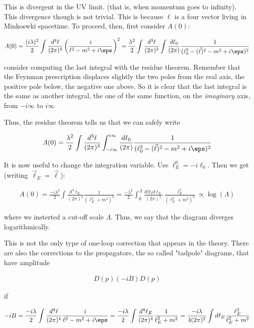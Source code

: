 \documentclass{report}
\begin{document}
This is divergent in the UV limit. (that is, when momentum goes to infinity). This divergence though is not trivial. This is because \(\ell\) is a four vector living in Minkoswki spacetime. To proceed, then, first consider \(A(0)\): 

\begin{align}
    A(0) = \frac{(i\lambda)^2}{2}\int \frac{d^4\ell}{(2\pi)^4}\left(\frac{i}{\ell^2-m^2+i\eps} \right)^2 = \frac{\lambda^2}{2}\int \frac{d^3\ell}{(2\pi)^3}\int \frac{d\ell_0}{(2\pi)}\frac{1}{(\ell_0^2 - (\vec{\ell})^2 -m^2 + i\eps)^2}
\end{align}

consider computing the last integral with the residue theorem. Remember that the Feynman prescription displaces slightly the two poles from the real axis, the positive pole below, the negative one above. So it is clear that the last integral is the same as another integral, the one of the same function, on the \emph{imaginary} axis, from \(-i\infty\) to \(i\infty\)

Thus, the residue theorem tells us that we can safely write 

\begin{align}
    A(0) = \frac{\lambda^2}{2}\int \frac{d^3\ell}{(2\pi)^3}\int_{-i\infty}^{i\infty} \frac{d\ell_0}{(2\pi)}\frac{1}{(\ell_0^2 - (\vec{\ell})^2 -m^2 + i\eps)^2}
\end{align}

It is now useful to change the integration variable. Use \(\ell_E^0 = -i\ell_0\). Then we get (writing \(\vec{\ell}_E = \vec{\ell}\)): 

\begin{align}
    A(0) = \frac{-i\lambda^2}{2}\int \frac{d^4\ell_E}{(2\pi)^4}\frac{1}{(\ell_E^2 +m^2)^2} = \frac{-\lambda^2}{2}\int_0^\Lambda \frac{d\Omega_3 d\ell_E}{(2\pi)^4}\frac{\ell_E^3}{(\ell_E^2+m^2)^2} \propto \log(\Lambda)
\end{align}

where we insterted a cut-off scale \(\Lambda\). Thus, we say that the diagram diverges logarithmically. 

This is not the only type of one-loop correction that appears in the theory. There are also the corrections to the propagatore, the so called "tadpole" diagrams, that have amplitude 

\begin{align}
    D(p)(-iB)D(p)
\end{align}

if 

\begin{align}
    -iB = \frac{-i\lambda}{2} \int \frac{d^4\ell}{(2\pi)^4}\frac{i}{\ell^2-m^2+i\eps} = \frac{-i\lambda}{2} \int \frac{d^4\ell_E}{(2\pi)^4}\frac{1}{\ell_E^2+m^2} = \frac{-i\lambda}{4(2\pi)^2}\int d\ell_E \frac{\ell_E^3}{\ell_E^2+m^2}
\end{align}
\end{document}
